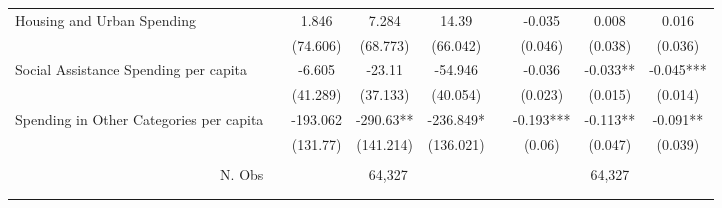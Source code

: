 \begin{table}[H]
\begin{footnotesize}
\begin{center}
{\begin{threeparttable}[b]
\begin{tabular}{rrrrrrrrr}
    \multicolumn{1}{l}{\multirow{2}[0]{*}{Housing and Urban Spending}} &       & \multicolumn{1}{c}{1.846} & \multicolumn{1}{c}{7.284} & \multicolumn{1}{c}{14.39} &       & \multicolumn{1}{c}{-0.035} & \multicolumn{1}{c}{0.008} & \multicolumn{1}{c}{0.016} \\
          &       & \multicolumn{1}{c}{(74.606)} & \multicolumn{1}{c}{(68.773)} & \multicolumn{1}{c}{(66.042)} &       & \multicolumn{1}{c}{(0.046)} & \multicolumn{1}{c}{(0.038)} & \multicolumn{1}{c}{(0.036)} \\
    \multicolumn{1}{l}{\multirow{2}[0]{*}{Social Assistance Spending per capita}} &       & \multicolumn{1}{c}{-6.605} & \multicolumn{1}{c}{-23.11} & \multicolumn{1}{c}{-54.946} &       & \multicolumn{1}{c}{-0.036} & \multicolumn{1}{c}{-0.033**} & \multicolumn{1}{c}{-0.045***} \\
          &       & \multicolumn{1}{c}{(41.289)} & \multicolumn{1}{c}{(37.133)} & \multicolumn{1}{c}{(40.054)} &       & \multicolumn{1}{c}{(0.023)} & \multicolumn{1}{c}{(0.015)} & \multicolumn{1}{c}{(0.014)} \\
    \multicolumn{1}{l}{\multirow{2}[0]{*}{Spending in Other Categories per capita}} &       & \multicolumn{1}{c}{-193.062} & \multicolumn{1}{c}{-290.63**} & \multicolumn{1}{c}{-236.849*} &       & \multicolumn{1}{c}{-0.193***} & \multicolumn{1}{c}{-0.113**} & \multicolumn{1}{c}{-0.091**} \\
          &       & \multicolumn{1}{c}{(131.77)} & \multicolumn{1}{c}{(141.214)} & \multicolumn{1}{c}{(136.021)} &       & \multicolumn{1}{c}{(0.06)} & \multicolumn{1}{c}{(0.047)} & \multicolumn{1}{c}{(0.039)} \\
          &       &       &       &       &       &       &       &  \\
    \multicolumn{1}{p{15.145em}}{N. Obs} &       & \multicolumn{3}{c}{64,327} &       & \multicolumn{3}{c}{64,327} \\
          &       &       &       &       &       &       &       &  \\
    \midrule
    \midrule
          &       &       &       &       &       &       &       &  \\
    \end{tabular}%
    
  \label{table:spending_finbra}%

\end{threeparttable}
}
\end{center}
\end{footnotesize}
\end{table}
